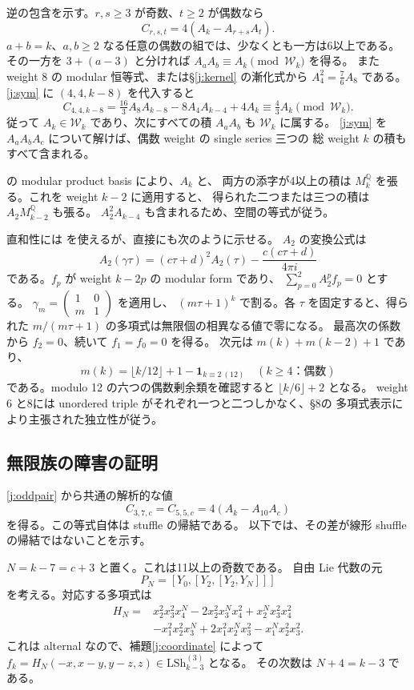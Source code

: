 \documentclass[12pt]{amsart}
\theoremstyle{definition}
\theoremstyle{remark}
\numberwithin{equation}{section}
\newcommand{\Q}{\mathbb{Q}}
\newcommand{\LS}{\mathrm{LSh}}
\newcommand{\WW}{\mathcal W}
\numberwithin{equation}{section}
\begin{document}
逆の包含を示す。$r,s\ge3$ が奇数、$t\ge2$ が偶数なら
\begin{equation}\label{j:oddpair}
 C_{r,s,t}=4(A_k-A_{r+s}A_t).
\end{equation}
$a+b=k$、$a,b\ge2$ なる任意の偶数の組では、少なくとも一方は6以上である。
その一方を $3+(a-3)$ と分ければ $A_aA_b\equiv A_k\pmod{\WW_k}$ を得る。
また weight 8 の modular 恒等式、または\S\ref{j:kernel} の漸化式から
$A_4^2=\frac76 A_8$ である。\eqref{j:sym} に $(4,4,k-8)$ を代入すると
\[
 C_{4,4,k-8}=\tfrac{16}{3}A_8A_{k-8}-8A_4A_{k-4}+4A_k
             \equiv\tfrac43 A_k\pmod{\WW_k}.
\]
従って $A_k\in\WW_k$ であり、次にすべての積 $A_aA_b$ も $\WW_k$ に属する。
\eqref{j:sym} を $A_aA_bA_c$ について解けば、偶数 weight の single series 三つの
総 weight $k$ の積もすべて含まれる。

\cite[Corollary 2, arXiv v1]{j-hirose} の modular product basis により、$A_k$ と、
両方の添字が4以上の積は $M_k^{\Q}$ を張る。これを weight $k-2$ に適用すると、
得られた二つまたは三つの積は $A_2M_{k-2}^{\Q}$ も張る。
$A_2^2A_{k-4}$ も含まれるため、空間の等式が従う。

直和性には \cite[Proposition 1(b)]{j-kzqm} を使えるが、直接にも次のように示せる。
$A_2$ の変換公式は
\[
 A_2(\gamma\tau)=(c\tau+d)^2A_2(\tau)-\frac{c(c\tau+d)}{4\pi i}
\]
である。$f_p$ が weight $k-2p$ の modular form であり、
$\sum_{p=0}^2 A_2^pf_p=0$ とする。
$\gamma_m=\left(\begin{smallmatrix}1&0\\m&1\end{smallmatrix}\right)$ を適用し、
$(m\tau+1)^k$ で割る。各 $\tau$ を固定すると、得られた
$m/(m\tau+1)$ の多項式は無限個の相異なる値で零になる。
最高次の係数から $f_2=0$、続いて $f_1=f_0=0$ を得る。
次元は $m(k)+m(k-2)+1$ であり、
\[
 m(k)=\lfloor k/12\rfloor+1-\mathbf1_{k\equiv2\ (12)}
 \quad(k\ge4\text{：偶数})
\]
である。modulo 12 の六つの偶数剰余類を確認すると $\lfloor k/6\rfloor+2$ となる。
weight 6 と8には unordered triple がそれぞれ一つと二つしかなく、\S8の
多項式表示により主張された独立性が従う。

\subsection{無限族の障害の証明}
\eqref{j:oddpair} から共通の解析的な値
\[
 C_{3,7,c}=C_{5,5,c}=4(A_k-A_{10}A_c)
\]
を得る。この等式自体は stuffle の帰結である。
以下では、その差が線形 shuffle の帰結ではないことを示す。

$N=k-7=c+3$ と置く。これは11以上の奇数である。
自由 Lie 代数の元
\[
 P_N=[Y_0,[Y_2,[Y_2,Y_N]]]
\]
を考える。対応する多項式は
\begin{align*}
 H_N={}&x_2^2x_3^2x_4^N-2x_2^2x_3^Nx_4^2+x_2^Nx_3^2x_4^2\\
       &-x_1^2x_2^2x_3^N+2x_1^2x_2^Nx_3^2-x_1^Nx_2^2x_3^2.
\end{align*}
これは alternal なので、補題\ref{j:coordinate} によって
$f_k=H_N(-x,x-y,y-z,z)\in\LS_{k-3}^{(3)}$ となる。
その次数は $N+4=k-3$ である。
\end{document}
